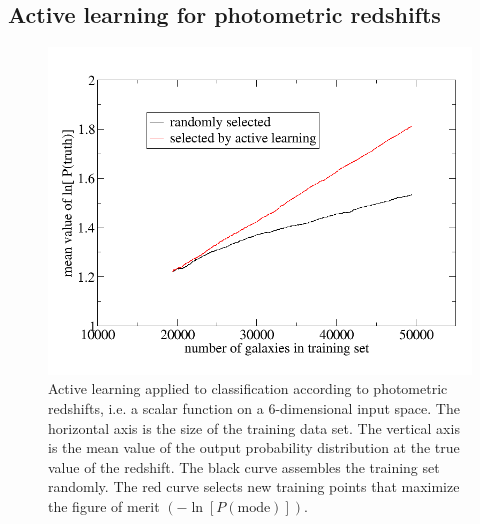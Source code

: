 \documentclass[prd,nofootbib,floatfix,11pt,tightenlines]{revtex4}
\begin{document}

\subsection{Active learning for photometric redshifts}

\begin{figure}[t]
\centerline{
\includegraphics[scale=0.3]{learning_curve.png}
}
\caption{
Active learning applied to classification according to photometric redshifts, 
i.e. a scalar function on a
6-dimensional input space.  The horizontal axis is the size of the training data
set.  The vertical axis is the mean value of the output probability distribution
at the true value of the redshift.  The black curve assembles the
training set randomly.  The red curve selects new training points that maximize
the figure of merit $\left(-\ln[P(\text{mode})]\right)$.
}
\label{fig:learning}
\end{figure}
\end{document}
